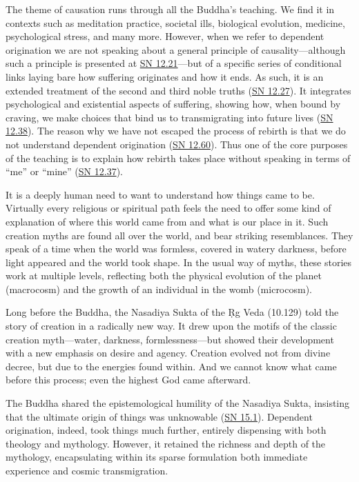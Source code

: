 \documentclass[12pt,openany]{book}%
\begin{document}
The theme of causation runs through all the Buddha’s teaching. We find it in contexts such as meditation practice, societal ills, biological evolution, medicine, psychological stress, and many more. However, when we refer to dependent origination we are not speaking about a general principle of causality—although such a principle is presented at \href{https://suttacentral.net/sn12.21}{SN 12.21}—but of a specific series of conditional links laying bare how suffering originates and how it ends. As such, it is an extended treatment of the second and third noble truths (\href{https://suttacentral.net/sn12.27}{SN 12.27}). It integrates psychological and existential aspects of suffering, showing how, when bound by craving, we make choices that bind us to transmigrating into future lives (\href{https://suttacentral.net/sn12.38}{SN 12.38}). The reason why we have not escaped the process of rebirth is that we do not understand dependent origination (\href{https://suttacentral.net/sn12.60}{SN 12.60}). Thus one of the core purposes of the teaching is to explain how rebirth takes place without speaking in terms of “me” or “mine” (\href{https://suttacentral.net/sn12.37}{SN 12.37}).

It is a deeply human need to want to understand how things came to be. Virtually every religious or spiritual path feels the need to offer some kind of explanation of where this world came from and what is our place in it. Such creation myths are found all over the world, and bear striking resemblances. They speak of a time when the world was formless, covered in watery darkness, before light appeared and the world took shape. In the usual way of myths, these stories work at multiple levels, reflecting both the physical evolution of the planet (macrocosm) and the growth of an individual in the womb (microcosm).

Long before the Buddha, the Nasadiya Sukta of the Ṛg Veda (10.129) told the story of creation in a radically new way. It drew upon the motifs of the classic creation myth—water, darkness, formlessness—but showed their development with a new emphasis on desire and agency. Creation evolved not from divine decree, but due to the energies found within. And we cannot know what came before this process; even the highest God came afterward.

The Buddha shared the epistemological humility of the Nasadiya Sukta, insisting that the ultimate origin of things was unknowable (\href{https://suttacentral.net/sn15.1}{SN 15.1}). Dependent origination, indeed, took things much further, entirely dispensing with both theology and mythology. However, it retained the richness and depth of the mythology, encapsulating within its sparse formulation both immediate experience and cosmic transmigration.
\end{document}
